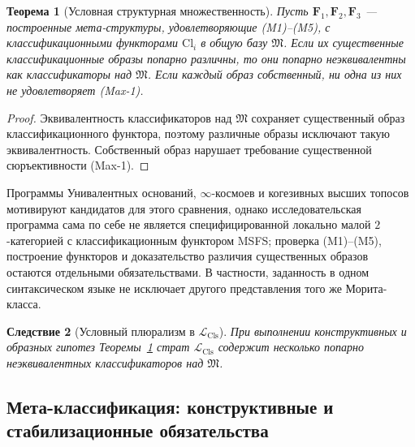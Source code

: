 \documentclass[11pt]{article}
\theoremstyle{plain}
\newtheorem{theorem}{Теорема}[section]
\newtheorem{corollary}[theorem]{Следствие}
\theoremstyle{definition}
\newcommand{\fM}{\mathfrak{M}}
\newcommand{\LCls}{\mathcal{L}_{\mathrm{Cls}}}
\newcommand{\Cl}{\mathrm{Cl}}
\begin{document}
\begin{theorem}[Условная структурная множественность]\label{thm:meta-mult}
Пусть $\mathbf F_1, \mathbf F_2, \mathbf F_3$ — построенные мета-структуры, удовлетворяющие (M1)--(M5), с классификационными функторами $\Cl_i$ в общую базу $\fM$. Если их существенные классификационные образы попарно различны, то они попарно неэквивалентны как классификаторы над $\fM$. Если каждый образ собственный, ни одна из них не удовлетворяет (Max-1).
\end{theorem}
\begin{proof}
Эквивалентность классификаторов над $\fM$ сохраняет существенный образ классификационного функтора, поэтому различные образы исключают такую эквивалентность. Собственный образ нарушает требование существенной сюръективности (Max-1).
\end{proof}
Программы Унивалентных оснований, $\infty$-космоев и когезивных высших топосов мотивируют кандидатов для этого сравнения, однако исследовательская программа сама по себе не является специфицированной локально малой $2$-категорией с классификационным функтором MSFS; проверка (M1)--(M5), построение функторов и доказательство различия существенных образов остаются отдельными обязательствами. В частности, заданность в одном синтаксическом языке не исключает другого представления того же Морита-класса.

\begin{corollary}[Условный плюрализм в $\LCls$]\label{cor:plurality}
При выполнении конструктивных и образных гипотез Теоремы~\ref{thm:meta-mult} страт $\LCls$ содержит несколько попарно неэквивалентных классификаторов над $\fM$.
\end{corollary}

\subsection{Мета-классификация: конструктивные и стабилизационные обязательства}
\end{document}
